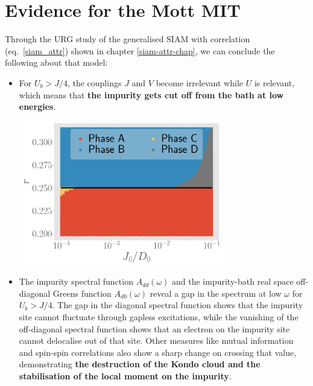 \documentclass{report}
\numberwithin{equation}{section}
\begin{document}
\section{Evidence for the Mott MIT}
Through the URG study of the generalised SIAM with correlation (eq.~\ref{siam_attr}) shown in chapter \ref{siam-attr-chap}, we can conclude the following about that model:
\begin{itemize}
	\item For \(U_b > J/4\), the couplings \(J\) and \(V\) become irrelevant while \(U\) is relevant, which means that \textbf{the impurity gets cut off from the bath at low energies}.
\begin{center}
	\includegraphics[width=0.7\textwidth]{../figures/phase-map-MIT.pdf}
\end{center}
\item The impurity spectral function \(A_{dd}(\omega)\) and the impurity-bath real space off-diagonal Greens function \(A_{d0}(\omega)\) reveal a gap in the spectrum at low \(\omega\) for \(U_b > J/4\). The gap in the diagonal spectral function shows that the impurity site cannot fluctuate through gapless excitations, while the vanishing of the off-diagonal spectral function shows that an electron on the impurity site cannot delocalise out of that site.  Other measures like mutual information and spin-spin correlations also show a sharp change on crossing that value, demonstrating \textbf{the destruction of the Kondo cloud and the stabilisation of the local moment on the impurity}.


\end{itemize}
\end{document}
